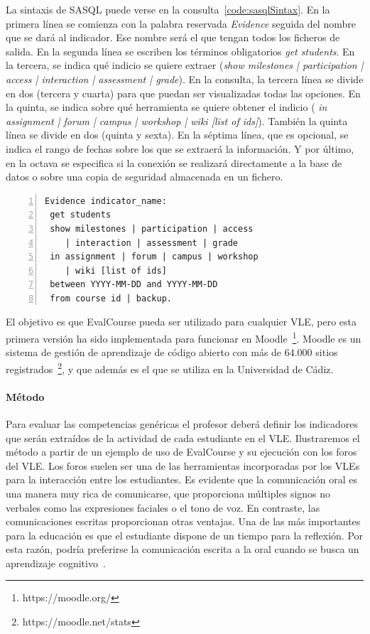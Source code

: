 La sintaxis de SASQL puede verse en la consulta~\ref{code:sasqlSintax}. En la primera línea se comienza con la palabra reservada \emph{Evidence} seguida del nombre que se dará al indicador. Ese nombre será el que tengan todos los ficheros de salida. En la segunda línea se escriben los términos obligatorios \emph{get students}. En la tercera, se indica qué indicio se quiere extraer (\emph{show milestones | participation | access | interaction | assessment | grade}). En la consulta, la tercera línea se divide en dos (tercera y cuarta) para que puedan ser visualizadas todas las opciones. En la quinta, se indica sobre qué herramienta se quiere obtener el indicio (\emph{ in assignment | forum | campus | workshop | wiki [list of ids]}). También la quinta línea se divide en dos (quinta y sexta). En la séptima línea, que es opcional, se indica el rango de fechas sobre los que se extraerá la información. Y por último, en la octava se especifica si la conexión se realizará directamente a la base de datos o sobre una copia de seguridad almacenada en un fichero.

\begin{lstlisting}[caption=Sintaxis de SASQL (las palabras reservadas se muestran resaltadas),label=code:sasqlSintax,numbers=left, captionpos=b, morekeywords={Evidence,get, students, show, milestones, participation, access, in, assignment, forum, campus, wiki, between, and, workshop, interaction, assessment, grade, from, course, backup}]
Evidence indicator_name:
 get students 
 show milestones | participation | access 
	| interaction | assessment | grade
 in assignment | forum | campus | workshop 
	| wiki [list of ids]
 between YYYY-MM-DD and YYYY-MM-DD
 from course id | backup.
\end{lstlisting}

El objetivo es que EvalCourse pueda ser utilizado para cualquier VLE, pero esta primera versión ha sido implementada para funcionar en Moodle~\footnote{https://moodle.org/}. Moodle es un sistema de gestión de aprendizaje de código abierto con más de 64.000 sitios registrados~\footnote{https://moodle.net/stats}, y que además es el que se utiliza en la Universidad de Cádiz.

\paragraph{Método}

Para evaluar las competencias genéricas el profesor deberá definir los indicadores que serán extraídos de la actividad de cada estudiante en el VLE. Ilustraremos el método a partir de un ejemplo de uso de EvalCourse y su ejecución con los foros del VLE. Los foros suelen ser una de las herramientas incorporadas por los VLEs para la interacción entre los estudiantes. Es evidente que la comunicación oral es una manera muy rica de comunicarse, que proporciona múltiples signos no verbales como las expresiones faciales o el tono de voz. En contraste, las comunicaciones escritas proporcionan otras ventajas. Una de las más importantes para la educación es que el estudiante dispone de un tiempo para la reflexión. Por esta razón, podría preferirse la comunicación escrita a la oral cuando se busca un aprendizaje cognitivo~\cite{garrison1999critical}.

